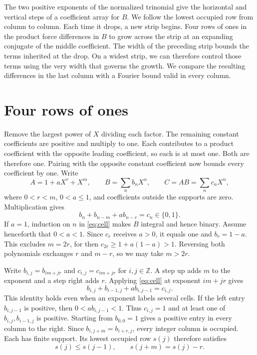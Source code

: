 \documentclass[11pt,reqno]{amsart}
\begin{document}
The two positive exponents of the normalized trinomial give the horizontal and vertical steps of a coefficient array for \(B\). We follow the lowest occupied row from column to column. Each time it drops, a new strip begins. Four rows of ones in the product force differences in \(B\) to grow across the strip at an expanding conjugate of the middle coefficient. The width of the preceding strip bounds the terms inherited at the drop. On a widest strip, we can therefore control those terms using the very width that governs the growth. We compare the resulting differences in the last column with a Fourier bound valid in every column.

\section{Four rows of ones}\label{sec:strip}
Remove the largest power of \(X\) dividing each factor. The remaining constant coefficients are positive and multiply to one. Each contributes to a product coefficient with the opposite leading coefficient, so each is at most one. Both are therefore one. Pairing with the opposite constant coefficient now bounds every coefficient by one. Write
\[
 A=1+aX^r+X^m,\qquad B=\sum_n b_nX^n,\qquad C=AB=\sum_n c_nX^n,
\]
where \(0<r<m\), \(0<a\le1\), and coefficients outside the supports are zero. Multiplication gives
\begin{equation}\label{eq:cell}
 b_n+b_{n-m}+a b_{n-r}=c_n\in\{0,1\}.
\end{equation}
If \(a=1\), induction on \(n\) in \eqref{eq:cell} makes \(B\) integral and hence binary. Assume henceforth that \(0<a<1\). Since \(c_r\) receives \(a>0\), it equals one and \(b_r=1-a\). This excludes \(m=2r\), for then \(c_{2r}\ge1+a(1-a)>1\). Reversing both polynomials exchanges \(r\) and \(m-r\), so we may take \(m>2r\).

Write \(b_{i,j}=b_{im+jr}\) and \(c_{i,j}=c_{im+jr}\) for \(i,j\in\mathbb Z\). A step up adds \(m\) to the exponent and a step right adds \(r\). Applying \eqref{eq:cell} at exponent \(im+jr\) gives
\[
 b_{i,j}+b_{i-1,j}+a b_{i,j-1}=c_{i,j}.
\]
This identity holds even when an exponent labels several cells. If the left entry \(b_{i,j-1}\) is positive, then \(0<a b_{i,j-1}<1\). Thus \(c_{i,j}=1\) and at least one of \(b_{i,j},b_{i-1,j}\) is positive. Starting from \(b_{0,0}=1\) gives a positive entry in every column to the right. Since \(b_{i,j+m}=b_{i+r,j}\), every integer column is occupied. Each has finite support. Its lowest occupied row \(s(j)\) therefore satisfies
\[
 s(j)\le s(j-1),\qquad s(j+m)=s(j)-r.
\]
\end{document}
